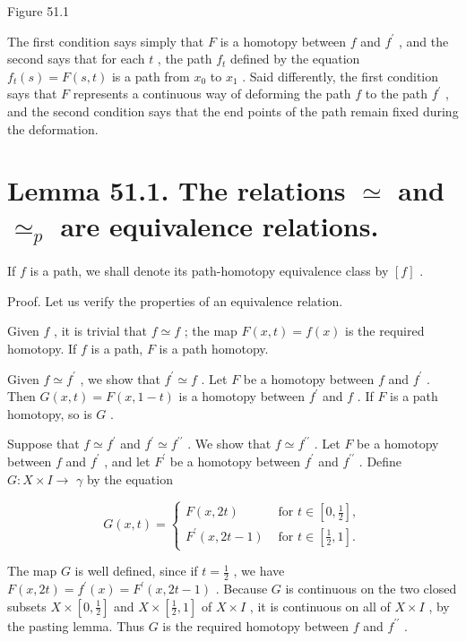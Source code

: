 Figure 51.1

The first condition says simply that \(F\) is a homotopy between \(f\) and \({f}^{\prime }\) , and the second says that for each \(t\) , the path \({f}_{t}\) defined by the equation \({f}_{t}\left( s\right)  = F\left( {s,t}\right)\) is a path from \({x}_{0}\) to \({x}_{1}\) . Said differently, the first condition says that \(F\) represents a continuous way of deforming the path \(f\) to the path \({f}^{\prime }\) , and the second condition says that the end points of the path remain fixed during the deformation.

\section*{Lemma 51.1. The relations \(\simeq\) and \({ \simeq  }_{p}\) are equivalence relations.}

If \(f\) is a path, we shall denote its path-homotopy equivalence class by \(\left\lbrack  f\right\rbrack\) .

Proof. Let us verify the properties of an equivalence relation.

Given \(f\) , it is trivial that \(f \simeq  f\) ; the map \(F\left( {x,t}\right)  = f\left( x\right)\) is the required homotopy. If \(f\) is a path, \(F\) is a path homotopy.

Given \(f \simeq  {f}^{\prime }\) , we show that \({f}^{\prime } \simeq  f\) . Let \(F\) be a homotopy between \(f\) and \({f}^{\prime }\) . Then \(G\left( {x,t}\right)  = F\left( {x,1 - t}\right)\) is a homotopy between \({f}^{\prime }\) and \(f\) . If \(F\) is a path homotopy, so is \(G\) .

Suppose that \(f \simeq  {f}^{\prime }\) and \({f}^{\prime } \simeq  {f}^{\prime \prime }\) . We show that \(f \simeq  {f}^{\prime \prime }\) . Let \(F\) be a homotopy between \(f\) and \({f}^{\prime }\) , and let \({F}^{\prime }\) be a homotopy between \({f}^{\prime }\) and \({f}^{\prime \prime }\) . Define \(G : X \times  I \rightarrow\)  \(\gamma\) by the equation

\[
G\left( {x,t}\right)  = \left\{  \begin{array}{ll} F\left( {x,{2t}}\right) & \text{ for }t \in  \left\lbrack  {0,\frac{1}{2}}\right\rbrack  , \\  {F}^{\prime }\left( {x,{2t} - 1}\right) & \text{ for }t \in  \left\lbrack  {\frac{1}{2},1}\right\rbrack  . \end{array}\right.
\]

The map \(G\) is well defined, since if \(t = \frac{1}{2}\) , we have \(F\left( {x,{2t}}\right)  = {f}^{\prime }\left( x\right)  = {F}^{\prime }\left( {x,{2t} - 1}\right)\) . Because \(G\) is continuous on the two closed subsets \(X \times  \left\lbrack  {0,\frac{1}{2}}\right\rbrack\) and \(X \times  \left\lbrack  {\frac{1}{2},1}\right\rbrack\) of \(X \times  I\) , it is continuous on all of \(X \times  I\) , by the pasting lemma. Thus \(G\) is the required homotopy between \(f\) and \({f}^{\prime \prime }\) .

